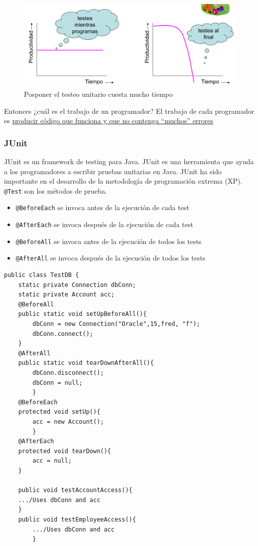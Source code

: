 \begin{figure}[htbp]
   \centering
   \includegraphics{images/03/unitPostpone.png}
   \caption{Posponer el testeo unitario cuesta mucho tiempo}
   \label{fig:03/unitPostpone}
\end{figure}


Entonces ¿cuál es el trabajo de un programador? El trabajo de cada programador es \ul{producir código que
funciona y que no contenga ``muchos'' errores}

\subsubsection{JUnit}

\begin{paracol}{2}
	
	\colfill
	JUnit es un framework de testing para Java. JUnit es una herramienta que ayuda a los programadores a escribir pruebas unitarias en Java. JUnit ha sido importante en el desarrollo de la metodología de programación extrema (XP).
	\lstinline|@Test| son los métodos de prueba.
	\begin{itemize}
		\item \lstinline|@BeforeEach| se invoca antes de la ejecución de cada test
		\item \lstinline|@AfterEach| se invoca después de la ejecución de cada test
		\item \lstinline|@BeforeAll| se invoca antes de la ejecución de todos los tests
		\item \lstinline|@AfterAll| se invoca después de la ejecución de todos los tests
	\end{itemize}
	
	\colfill
	\switchcolumn

	\begin{lstlisting}
public class TestDB {
	static private Connection dbConn;
	static private Account acc;
	@BeforeAll
	public static void setUpBeforeAll(){
		dbConn = new Connection("Oracle",15,fred, "f");
		dbConn.connect();
	}
	@AfterAll
	public static void tearDownAfterAll(){
		dbConn.disconnect();
		dbConn = null;
		}
	@BeforeEach
	protected void setUp(){
		acc = new Account();
		}
	@AfterEach
	protected void tearDown(){
		acc = null;
	}
	
	public void testAccountAccess(){
	.../Uses dbConn and acc
	}
	public void testEmployeeAccess(){
		.../Uses dbConn and acc
		}
\end{lstlisting}			
\end{paracol}


